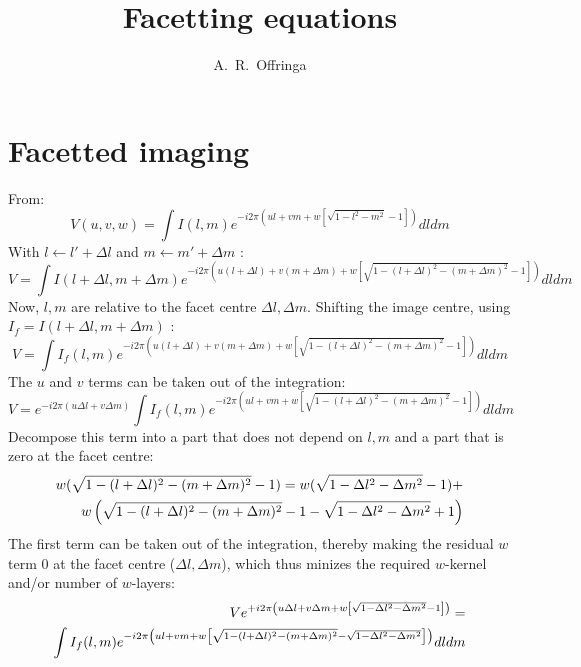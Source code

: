 \documentclass[a4paper,10pt]{article}
\title{Facetting equations}
\author{A.~R.~Offringa}
\begin{document}
\label{firstpage}
\maketitle

\section{Facetted imaging}

From:
\begin{equation}
V(u,v,w) = \int I(l,m) e^{-i 2\pi \left(ul + vm + w[\sqrt{1-l^2-m^2}-1]\right)} dl dm
\end{equation}
With $l\leftarrow l' + \Delta l$ and $m\leftarrow m' + \Delta m$ :
\begin{equation}
V = \int I(l+\Delta l,m + \Delta m) e^{-i 2\pi \left(u(l+\Delta l) + v(m+\Delta m) + w[\sqrt{1-(l+\Delta l)^2-(m+\Delta m)^2}-1]\right)}  dl dm
\end{equation}
Now, $l,m$ are relative to the facet centre $\Delta l, \Delta m$. Shifting the image centre, using $I_f = I(l+\Delta l,m + \Delta m)$ :
\begin{equation}
V = \int I_f(l,m) e^{-i 2\pi \left(u(l+\Delta l) + v(m+\Delta m) + w[\sqrt{1-(l+\Delta l)^2-(m+\Delta m)^2}-1]\right)}  dl dm
\end{equation}
The $u$ and $v$ terms can be taken out of the integration:
\begin{equation}
V = e^{-i 2\pi \left(u\Delta l + v\Delta m\right)} \int I_f(l,m) e^{-i 2\pi \left(ul + vm + w[\sqrt{1-(l+\Delta l)^2-(m+\Delta m)^2}-1]\right)}  dl dm
\end{equation}
Decompose this term into a part that does not depend on $l,m$ and a part that is zero at the facet centre:
\begin{eqnarray}\notag
w(\sqrt{1-(l+\Delta l)^2-(m+\Delta m)^2}-1)= w(\sqrt{1 - \Delta l^2 - \Delta m^2}-1) + \\
 w \left( \sqrt{1-(l+\Delta l)^2-(m+\Delta m)^2}-1 - \sqrt{1 - \Delta l^2 - \Delta m^2}+1 \right)
\end{eqnarray}
The first term can be taken out of the integration, thereby making the residual $w$ term 0 at the facet centre ($\Delta l, \Delta m$), which thus minizes the required $w$-kernel and/or number of $w$-layers:
\begin{eqnarray}\notag
V e^{+i 2\pi \left(u\Delta l + v\Delta m + w\left[\sqrt{1 - \Delta l^2 - \Delta m^2}-1\right]\right)} = \\ \int I_f(l,m) e^{-i 2\pi \left(ul + vm + w\left[ \sqrt{1-(l+\Delta l)^2-(m+\Delta m)^2} - \sqrt{1 - \Delta l^2 - \Delta m^2} \right]\right)}  dl dm
\end{eqnarray}
\end{document}
